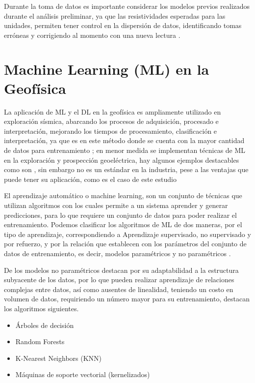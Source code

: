 			Durante la toma de datos es importante considerar los modelos previos realizados durante el análisis preliminar, ya que las resistividades esperadas para las unidades, permiten tener control en la dispersión de datos, identificando tomas erróneas y corrigiendo al momento con una nueva lectura \citep{telford1990}.
	
	\section{Machine Learning (ML) en la Geofísica}  
	
	La aplicación de ML y el DL en la geofísica es ampliamente utilizado en exploración sísmica, abarcando los procesos de adquisición, procesado e interpretación, mejorando los tiempos de procesamiento, clasificación e interpretación, ya que es en este método donde se cuenta con la mayor cantidad de datos para entrenamiento \citep{wrona2018}; en menor medida se implementan técnicas de ML en la exploración y prospección geoeléctrica, hay algunos ejemplos destacables como son \cite{liu2020, el2001, li2024}, sin embargo no es un estándar en la industria, pese a las ventajas que puede tener su aplicación, como es el caso de este estudio
		
	El aprendizaje automático o machine learning, son un conjunto de técnicas que utilizan algoritmos con los cuales permite a un sistema aprender y generar predicciones, para lo que requiere un conjunto de datos para poder realizar el entrenamiento. Podemos clasificar los algoritmos de ML de dos maneras, por el tipo de aprendizaje, correspondiendo a Aprendizaje supervisado, no supervisado y por refuerzo, y por la relación que establecen con los parámetros del conjunto de datos de entrenamiento, es decir, modelos paramétricos y no paramétricos \citep{li2024}. 
	
	De los modelos no paramétricos destacan por su adaptabilidad a la estructura subyacente de los datos, por lo que pueden realizar aprendizaje de relaciones complejas entre datos, así como ausentes de linealidad, teniendo un costo en volumen de datos, requiriendo un número mayor para su entrenamiento, destacan los algoritmos siguientes.
	
	\begin{itemize}
		\item Árboles de decisión
		\item Random Forests
		\item K-Nearest Neighbors (KNN)
		\item Máquinas de soporte vectorial (kernelizados)
	\end{itemize}
	
